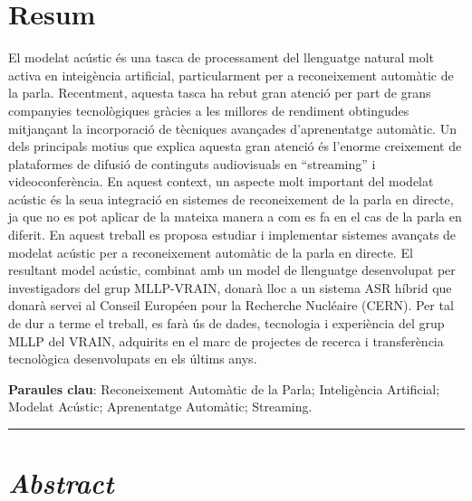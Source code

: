 
\section*{Resum}
El modelat acústic és una tasca de processament del llenguatge natural molt activa en inte\lgem igència artificial, particularment per a reconeixement automàtic de la parla.
Recentment, aquesta tasca ha rebut gran atenció per part de grans companyies tecnològiques gràcies a les millores de rendiment obtingudes mitjançant la incorporació de tècniques avançades d'aprenentatge automàtic.
Un dels principals motius que explica aquesta gran atenció és l'enorme creixement de plataformes de difusió de continguts audiovisuals en ``streaming'' i videoconferència.
En aquest context, un aspecte molt important del modelat acústic és la seua integració en sistemes de reconeixement de la parla en directe, ja que no es pot aplicar de la mateixa manera a com es fa en el cas de la parla en diferit.
En aquest treball es proposa estudiar i implementar sistemes avançats de modelat acústic per a reconeixement automàtic de la parla en directe.
El resultant model acústic, combinat amb un model de llenguatge desenvolupat per investigadors del grup MLLP-VRAIN, donarà lloc a un sistema ASR híbrid que donarà servei al Conseil Européen pour la Recherche Nucléaire (CERN).
Per tal de dur a terme el treball, es farà ús de dades, tecnologia i experiència del grup MLLP del VRAIN, adquirits en el marc de projectes de recerca i transferència tecnològica desenvolupats en els últims anys.

\textbf{Paraules clau}: Reconeixement Automàtic de la Parla; Intel\lgem igència Artificial; Modelat Acústic; Aprenentatge Automàtic; Streaming.

\medskip
\rule{\textwidth}{0.5pt}


\section*{\textit{Abstract}}

